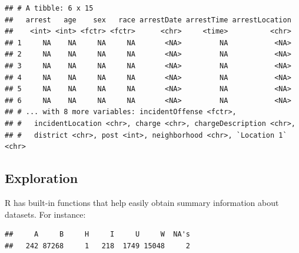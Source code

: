 \documentclass[]{article}
\newenvironment{Shaded}{\begin{snugshade}}{\end{snugshade}}
\newcommand{\KeywordTok}[1]{\textcolor[rgb]{0.13,0.29,0.53}{\textbf{{#1}}}}
\newcommand{\DecValTok}[1]{\textcolor[rgb]{0.00,0.00,0.81}{{#1}}}
\newcommand{\StringTok}[1]{\textcolor[rgb]{0.31,0.60,0.02}{{#1}}}
\newcommand{\CommentTok}[1]{\textcolor[rgb]{0.56,0.35,0.01}{\textit{{#1}}}}
\newcommand{\NormalTok}[1]{{#1}}
\theoremstyle{definition}
\theoremstyle{definition}
\theoremstyle{remark}
\begin{document}
\begin{verbatim}
## # A tibble: 6 x 15
##   arrest   age    sex   race arrestDate arrestTime arrestLocation
##    <int> <int> <fctr> <fctr>      <chr>     <time>          <chr>
## 1     NA    NA     NA     NA       <NA>         NA           <NA>
## 2     NA    NA     NA     NA       <NA>         NA           <NA>
## 3     NA    NA     NA     NA       <NA>         NA           <NA>
## 4     NA    NA     NA     NA       <NA>         NA           <NA>
## 5     NA    NA     NA     NA       <NA>         NA           <NA>
## 6     NA    NA     NA     NA       <NA>         NA           <NA>
## # ... with 8 more variables: incidentOffense <fctr>,
## #   incidentLocation <chr>, charge <chr>, chargeDescription <chr>,
## #   district <chr>, post <int>, neighborhood <chr>, `Location 1` <chr>
\end{verbatim}

\begin{Shaded}
\end{Shaded}

\subsection{Exploration}\label{exploration}

R has built-in functions that help easily obtain summary information
about datasets. For instance:

\begin{Shaded}
\end{Shaded}

\begin{verbatim}
##     A     B     H     I     U     W  NA's 
##   242 87268     1   218  1749 15048     2
\end{verbatim}

\begin{Shaded}
\end{Shaded}
\end{document}
